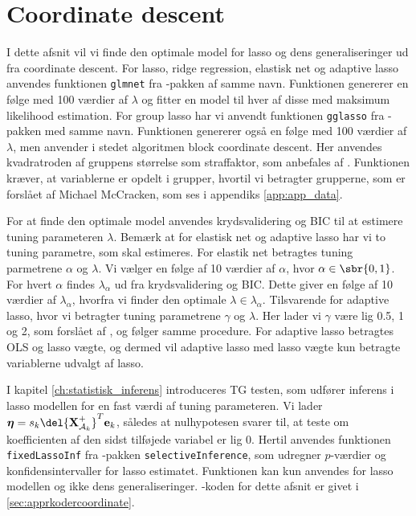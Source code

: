\section{Coordinate descent}
I dette afsnit vil vi finde den optimale model for lasso og dens generaliseringer ud fra coordinate descent.
For lasso, ridge regression, elastisk net og adaptive lasso anvendes funktionen \texttt{glmnet} fra \Rlang-pakken af samme navn.
Funktionen genererer en følge med 100 værdier af $\lambda$ og fitter en model til hver af disse med maksimum likelihood estimation.
For group lasso har vi anvendt funktionen \texttt{gglasso} fra \Rlang-pakken med samme navn. 
Funktionen genererer også en følge med 100 værdier af $\lambda$, men anvender i stedet algoritmen block coordinate descent. 
Her anvendes kvadratroden af gruppens størrelse som straffaktor, som anbefales af \citep{group_lasso}.
Funktionen kræver, at variablerne er opdelt i grupper, hvortil vi betragter grupperne, som er forslået af Michael McCracken, som ses i appendiks \ref{app:app_data}. 

For at finde den optimale model anvendes krydsvalidering og BIC til at estimere tuning parameteren $\lambda$.
Bemærk at for elastisk net og adaptive lasso har vi to tuning parametre, som skal estimeres. 
For elastik net betragtes tuning parmetrene $\alpha$ og $\lambda$.
Vi vælger en følge af 10 værdier af \(\alpha\), hvor $\alpha \in \sbr{0,1}$.
For hvert \(\alpha\) findes \(\lambda_\alpha\) ud fra krydsvalidering og BIC.
Dette giver en følge af 10 værdier af \(\lambda_\alpha\), hvorfra vi finder den optimale \(\lambda \in \lambda_\alpha\).
Tilsvarende for adaptive lasso, hvor vi betragter tuning parametrene $\gamma$ og $\lambda$.
Her lader vi $\gamma$ være lig 0.5, 1 og 2, som forslået af \citep{adaptive_lasso}, og følger samme procedure.
For adaptive lasso betragtes OLS og lasso vægte, og dermed vil adaptive lasso med lasso vægte kun betragte variablerne udvalgt af lasso.

I kapitel \ref{ch:statistisk_inferens} introduceres TG testen, som udfører inferens i lasso modellen for en fast værdi af tuning parameteren.
Vi lader $\boldsymbol{\eta} = s_k \del{\textbf{X}^+_{\mathcal{A}_k}}^T \mathbf{e}_k$, således at nulhypotesen svarer til, at teste om koefficienten af den sidst tilføjede variabel er lig 0.
Hertil anvendes funktionen \texttt{fixedLassoInf} fra \Rlang-pakken \texttt{selectiveInference}, som udregner \(p\)-værdier og konfidensintervaller for lasso estimatet.
Funktionen kan kun anvendes for lasso modellen og ikke dens generaliseringer. 
\Rlang-koden for dette afsnit er givet i  \ref{sec:apprkodercoordinate}.






